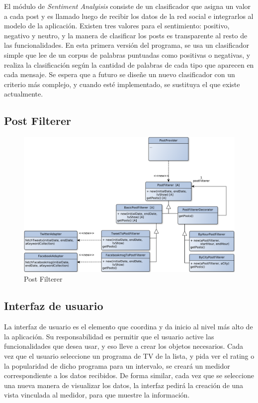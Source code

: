 El módulo de \emph{Sentiment Analyisis} consiste de un clasificador que asigna un valor a cada post y es llamado luego de recibir los datos de la red social e integrarlos al modelo de la aplicación. Existen tres valores para el sentimiento: positivo, negativo y neutro, y la manera de clasificar los posts es transparente al resto de las funcionalidades. En esta primera versión del programa, se usa un clasificador simple que lee de un corpus de palabras puntuadas como positivas o negativas, y realiza la clasificación según la cantidad de palabras de cada tipo que aparecen en cada mensaje. Se espera que a futuro se diseñe un nuevo clasificador con un criterio más complejo, y cuando esté implementado, se sustituya el que existe actualmente.




\subsection{Post Filterer}

\begin{figure}[H]
\centering
\includegraphics[width=\textwidth]{graph/clase/filterer.pdf}
\caption{Post Filterer}
\end{figure}



\subsection{Interfaz de usuario}

La interfaz de usuario es el elemento que coordina y da inicio al nivel más alto de la aplicación. Su responsabilidad es permitir que el usuario active las funcionalidades que desea usar, y eso lleve a crear los objetos necesarios. Cada vez que el usuario seleccione un programa de TV de la lista, y pida ver el rating o la popularidad de dicho programa para un intervalo, se creará un medidor correspondiente a los datos recibidos. De forma similar, cada vez que se seleccione una nueva manera de visualizar los datos, la interfaz pedirá la creación de una vista vinculada al medidor, para que muestre la información.